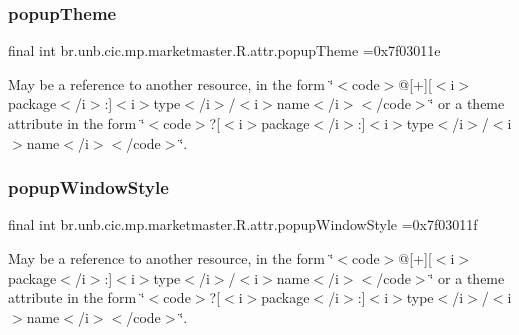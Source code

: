 \subsubsection{\texorpdfstring{popup\+Theme}{popupTheme}}
{\footnotesize\ttfamily final int br.\+unb.\+cic.\+mp.\+marketmaster.\+R.\+attr.\+popup\+Theme =0x7f03011e\hspace{0.3cm}{\ttfamily [static]}}

May be a reference to another resource, in the form \char`\"{}$<$code$>$@\mbox{[}+\mbox{]}\mbox{[}$<$i$>$package$<$/i$>$\+:\mbox{]}$<$i$>$type$<$/i$>$/$<$i$>$name$<$/i$>$$<$/code$>$\char`\"{} or a theme attribute in the form \char`\"{}$<$code$>$?\mbox{[}$<$i$>$package$<$/i$>$\+:\mbox{]}$<$i$>$type$<$/i$>$/$<$i$>$name$<$/i$>$$<$/code$>$\char`\"{}. \mbox{\label{classbr_1_1unb_1_1cic_1_1mp_1_1marketmaster_1_1R_1_1attr_a471c12ce7525e0e1f1786c3eb5d1c524}} 
\subsubsection{\texorpdfstring{popup\+Window\+Style}{popupWindowStyle}}
{\footnotesize\ttfamily final int br.\+unb.\+cic.\+mp.\+marketmaster.\+R.\+attr.\+popup\+Window\+Style =0x7f03011f\hspace{0.3cm}{\ttfamily [static]}}

May be a reference to another resource, in the form \char`\"{}$<$code$>$@\mbox{[}+\mbox{]}\mbox{[}$<$i$>$package$<$/i$>$\+:\mbox{]}$<$i$>$type$<$/i$>$/$<$i$>$name$<$/i$>$$<$/code$>$\char`\"{} or a theme attribute in the form \char`\"{}$<$code$>$?\mbox{[}$<$i$>$package$<$/i$>$\+:\mbox{]}$<$i$>$type$<$/i$>$/$<$i$>$name$<$/i$>$$<$/code$>$\char`\"{}. \mbox{\label{classbr_1_1unb_1_1cic_1_1mp_1_1marketmaster_1_1R_1_1attr_a59aa688dbe10701b8abfad303708a489}} 
